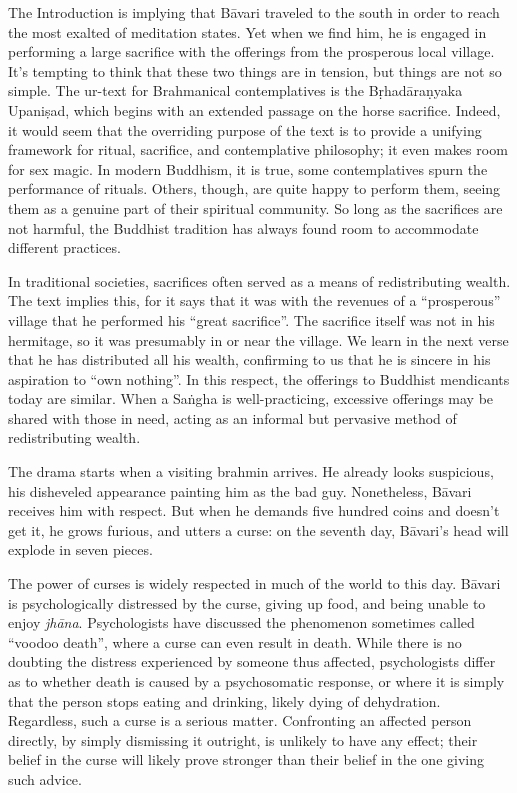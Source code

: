 \documentclass[12pt,openany]{book}%
\begin{document}
The Introduction is implying that \textsanskrit{Bāvari} traveled to the south in order to reach the most exalted of meditation states. Yet when we find him, he is engaged in performing a large sacrifice with the offerings from the prosperous local village. It’s tempting to think that these two things are in tension, but things are not so simple. The ur-text for Brahmanical contemplatives is the \textsanskrit{Bṛhadāraṇyaka} \textsanskrit{Upaniṣad}, which begins with an extended passage on the horse sacrifice. Indeed, it would seem that the overriding purpose of the text is to provide a unifying framework for ritual, sacrifice, and contemplative philosophy; it even makes room for sex magic. In modern Buddhism, it is true, some contemplatives spurn the performance of rituals. Others, though, are quite happy to perform them, seeing them as a genuine part of their spiritual community. So long as the sacrifices are not harmful, the Buddhist tradition has always found room to accommodate different practices.

In traditional societies, sacrifices often served as a means of redistributing wealth. The text implies this, for it says that it was with the revenues of a “prosperous” village that he performed his “great sacrifice”. The sacrifice itself was not in his hermitage, so it was presumably in or near the village. We learn in the next verse that he has distributed all his wealth, confirming to us that he is sincere in his aspiration to “own nothing”. In this respect, the offerings to Buddhist mendicants today are similar. When a \textsanskrit{Saṅgha} is well-practicing, excessive offerings may be shared with those in need, acting as an informal but pervasive method of redistributing wealth.

The drama starts when a visiting brahmin arrives. He already looks suspicious, his disheveled appearance painting him as the bad guy. Nonetheless, \textsanskrit{Bāvari} receives him with respect. But when he demands five hundred coins and doesn’t get it, he grows furious, and utters a curse: on the seventh day, \textsanskrit{Bāvari}’s head will explode in seven pieces.

The power of curses is widely respected in much of the world to this day. \textsanskrit{Bāvari} is psychologically distressed by the curse, giving up food, and being unable to enjoy \textit{\textsanskrit{jhāna}}. Psychologists have discussed the phenomenon sometimes called “voodoo death”, where a curse can even result in death. While there is no doubting the distress experienced by someone thus affected, psychologists differ as to whether death is caused by a psychosomatic response, or where it is simply that the person stops eating and drinking, likely dying of dehydration. Regardless, such a curse is a serious matter. Confronting an affected person directly, by simply dismissing it outright, is unlikely to have any effect; their belief in the curse will likely prove stronger than their belief in the one giving such advice.
\end{document}
